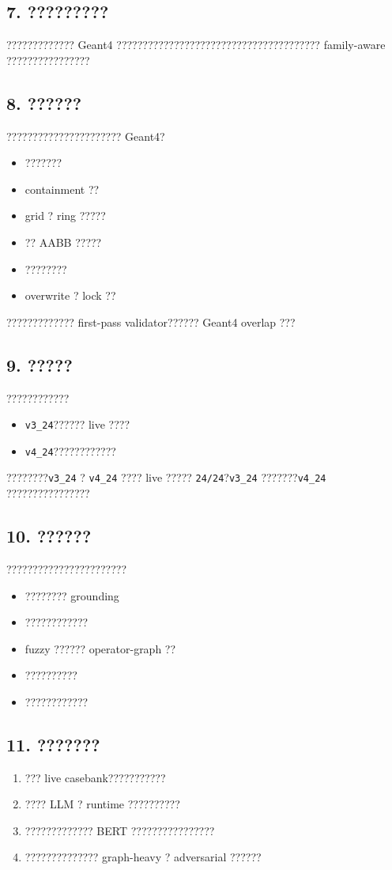 \documentclass[11pt,a4paper]{ctexart}
\begin{document}
\subsection*{7. ?????????}
????????????? Geant4 ??????????????????????????????????????? family-aware ????????????????
\subsection*{8. ??????}
?????????????????????? Geant4?
\begin{itemize}
\item ???????
\item containment ??
\item grid ? ring ?????
\item ?? AABB ?????
\item ????????
\item overwrite ? lock ??
\end{itemize}
????????????? first-pass validator?????? Geant4 overlap ???
\subsection*{9. ?????}
????????????
\begin{itemize}
\item \texttt{v3\_24}?????? live ????
\item \texttt{v4\_24}????????????
\end{itemize}
????????\texttt{v3\_24} ? \texttt{v4\_24} ???? live ????? \texttt{24/24}?\texttt{v3\_24} ???????\texttt{v4\_24} ????????????????
\subsection*{10. ??????}
???????????????????????
\begin{itemize}
\item ???????? grounding
\item ????????????
\item fuzzy ?????? operator-graph ??
\item ??????????
\item ????????????
\end{itemize}
\subsection*{11. ???????}
\begin{enumerate}
\item ??? live casebank???????????
\item ???? LLM ? runtime ??????????
\item ????????????? BERT ????????????????
\item ?????????????? graph-heavy ? adversarial ??????
\end{enumerate}
\end{document}
